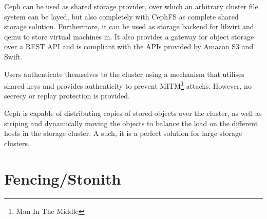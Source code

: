 Ceph can be used as shared storage provider, over which an arbitrary cluster file system can be layed, but also completely with CephFS as complete shared storage solution. Furthermore, it can be used as storage backend for libvirt and qemu to store virtual machines in. It also provides a gateway for object storage over a REST API and is compliant with the APIs provided by Amazon S3 and Swift.%

Users authenticate themselves to the cluster using a mechanism that utilises shared keys and provides authenticity to prevent MITM\footnote{Man In The Middle} attacks. However, no secrecy or replay protection is provided\cite{ceph_architecture}.

Ceph is capable of distributing copies of stored objects over the cluster, as well as striping and dynamically moving the objects to balance the load on the different hosts in the storage cluster. A such, it is a perfect solution for large storage clusters.

\section{Fencing/Stonith}
